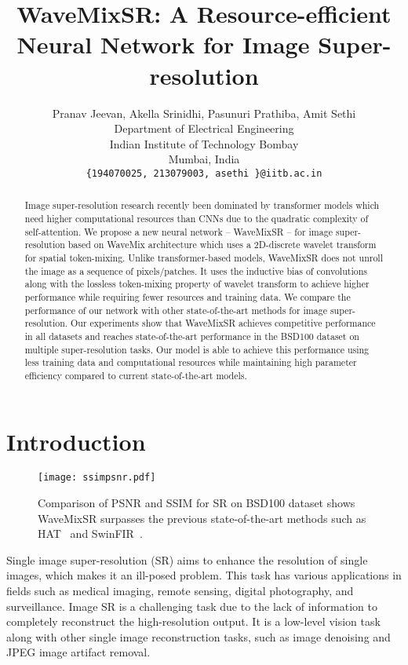 \documentclass{article}
\title{WaveMixSR: A Resource-efficient Neural Network for Image Super-resolution
}
\author{
  Pranav Jeevan, Akella Srinidhi, Pasunuri Prathiba, Amit Sethi \\
  Department of Electrical Engineering \\
  Indian Institute of Technology Bombay \\
  Mumbai, India\\
  \texttt{\{194070025, 213079003, asethi \}@iitb.ac.in} \\
\And
}
\begin{document}
\maketitle


\begin{abstract}
Image super-resolution research recently been dominated by transformer models which need higher computational resources than CNNs due to the quadratic complexity of self-attention. We propose a new neural network -- WaveMixSR -- for image super-resolution based on WaveMix architecture which uses a 2D-discrete wavelet transform for spatial token-mixing. Unlike transformer-based models, WaveMixSR does not unroll the image as a sequence of pixels/patches. It uses the inductive bias of convolutions along with the lossless token-mixing property of wavelet transform to achieve higher performance while requiring fewer resources and training data. We compare the performance of our network with other state-of-the-art methods for image super-resolution. Our experiments show that WaveMixSR achieves competitive performance in all datasets and reaches state-of-the-art performance in the BSD100 dataset on multiple super-resolution tasks. Our model is able to achieve this performance using less training data and computational resources while maintaining high parameter efficiency compared to current state-of-the-art models.
\end{abstract}




\section{Introduction}
\label{sec:intro}

\begin{figure}[b]

\centering
\texttt{[image: ssimpsnr.pdf]}
\caption{Comparison of PSNR and SSIM for  SR on BSD100 dataset shows WaveMixSR surpasses the previous state-of-the-art methods such as HAT~\cite{Chen_2023_CVPR} and SwinFIR~\cite{zhang2023swinfir}.}
\label{fig:graph}

\end{figure}



Single image super-resolution (SR) aims to enhance the resolution of single images, which makes it an ill-posed problem. This task has various applications in fields such as medical imaging, remote sensing, digital photography, and surveillance. Image SR is a challenging task due to the lack of information to completely reconstruct the high-resolution output. It is a low-level vision task along with other single image reconstruction tasks, such as image denoising and JPEG image artifact removal. 
\end{document}
